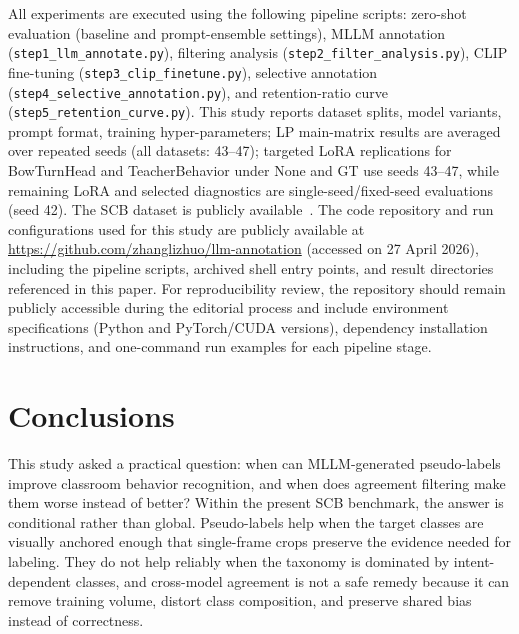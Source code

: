 \documentclass[10pt,letterpaper]{article}
\begin{document}
All experiments are executed using the following pipeline scripts:
zero-shot evaluation (baseline and prompt-ensemble settings),
MLLM annotation (\texttt{step1\_llm\_annotate.py}),
filtering analysis (\texttt{step2\_filter\_analysis.py}),
CLIP fine-tuning (\texttt{step3\_clip\_finetune.py}),
selective annotation (\texttt{step4\_selective\_annotation.py}),
and retention-ratio curve (\texttt{step5\_retention\_curve.py}).
This study reports dataset splits, model variants, prompt format,
training hyper-parameters; LP main-matrix results are averaged over
repeated seeds (all datasets: 43--47); targeted LoRA replications for BowTurnHead and
TeacherBehavior under None and GT use seeds 43--47, while remaining
LoRA and selected diagnostics are single-seed/fixed-seed evaluations
(seed 42).
The SCB dataset is publicly available~\cite{scb_dataset}.
The code repository and run configurations used for this study are
publicly available at \url{https://github.com/zhanglizhuo/llm-annotation}
(accessed on 27 April 2026), including the pipeline scripts, archived
shell entry points, and result directories referenced in this paper.
For reproducibility review, the repository should remain publicly
accessible during the editorial process and include environment
specifications (Python and PyTorch/CUDA versions), dependency
installation instructions, and one-command run examples for each
pipeline stage.

\section*{Conclusions}
\label{sec:conclusions}

This study asked a practical question: when can MLLM-generated
pseudo-labels improve classroom behavior recognition, and when does
agreement filtering make them worse instead of better?
Within the present SCB benchmark, the answer is conditional rather
than global.
Pseudo-labels help when the target classes are visually anchored
enough that single-frame crops preserve the evidence needed for
labeling.
They do not help reliably when the taxonomy is dominated by
intent-dependent classes, and cross-model agreement is not a safe
remedy because it can remove training volume, distort class
composition, and preserve shared bias instead of correctness.
\end{document}
